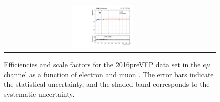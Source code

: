 \begin{figure}[h]
\begin{center}
\begin{tabular}{ccc}
      \includegraphics[width=0.32\textwidth]{fig_2016preVFP_TrigSF/g_emu_lepBpt_FullSystUncBand.pdf}\\
    \end{tabular}
    \caption{Efficiencies and scale factors for the 2016preVFP data set in the $e\mu$ channel as a function of electron and muon \pT.
            The error bars indicate the statistical uncertainty, and the shaded band corresponds to the systematic uncertainty.
            }
    \label{TrigSF_2016preVFP_1}
  \end{center}
\end{figure}


